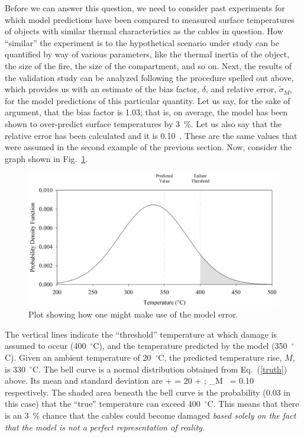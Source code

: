 Before we can answer this question, we need to consider past experiments for which model predictions have been compared to measured surface temperatures of objects
with similar thermal characteristics as the cables in question. How ``similar'' the experiment is to the hypothetical scenario under study can be quantified by way of
various parameters, like the thermal inertia of the object, the size of the fire, the size of the compartment, and so on. Next, the results of the validation study can be
analyzed following the procedure spelled out above, which provides us with an estimate of the bias factor, $\delta$, and relative error, $\tilde{\sigma}_M$, for the model
predictions of this particular quantity. Let us say, for the sake of argument, that the bias factor is 1.03; that is, on average, the model has been shown to over-predict
surface temperatures by 3~\%. Let us also say that the relative error has been calculated and it is 0.10~. These are the same values that were assumed in the second example
of the previous section.
Now, consider the graph shown in Fig.~\ref{bell_curve}.
\begin{figure}[t]
\begin{center}
\includegraphics[width=5.in]{FIGURES/bell_curve}
\end{center}
\caption[Demonstration of model error.]{Plot showing how one might make use of the model error.}
\label{bell_curve}
\end{figure}
The vertical lines indicate the ``threshold'' temperature at which damage is assumed to occur (400~$^\circ$C), and the temperature predicted by the
model (350~$^\circ$C). Given an ambient temperature of 20~$^\circ$C, the predicted temperature rise, $M$, is 330~$^\circ$C.
The bell curve is a normal distribution obtained from Eq.~(\ref{truth}) above. Its mean and standard deviation are
 +  = 20 +  \quad ; \quad  \widetilde{\sigma}_M \,  = 0.10 \,  \ee
respectively. The shaded area beneath the bell curve is the probability (0.03 in this case) that the ``true'' temperature can exceed 400~$^\circ$C.
This means that there is an 3~\% chance that the cables could
become damaged {\em based solely on the fact that the model is not a perfect representation of reality.}

